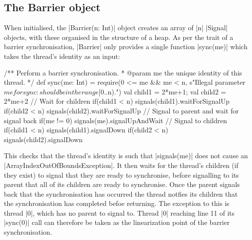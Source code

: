 
\subsection{The Barrier object}
\inlineScala
When initialised, the |Barrier(n: Int)| object creates an array of |n| |Signal| objects, with these organised in the structure of a heap. As per the trait of a barrier synchronisation, |Barrier| only provides a single function |sync(me)| which takes the thread's identity as an input:

\begin{scala}[caption={The Scala definition of the {\scalastyle Barrier.sync} function}]
/** Perform a barrier synchronisation.
  * @param me the unique identity of this thread. */
def sync(me: Int) = {
  require(0 <= me && me < n, 
    s"Illegal parameter $me for sync: should be in the range [0..$n).")
  val child1 = 2*me+1; val child2 = 2*me+2
  // Wait for children
  if(child1 < n) signals(child1).waitForSignalUp
  if(child2 < n) signals(child2).waitForSignalUp
  // Signal to parent and wait for signal back
  if(me != 0) signals(me).signalUpAndWait
  // Signal to children
  if(child1 < n) signals(child1).signalDown
  if(child2 < n) signals(child2).signalDown
}  
\end{scala}

This checks that the thread's identity is such that |signals(me)| does not cause an 
|ArrayIndexOutOfBoundsException|. It then waits for the thread's children (if they exist) to signal that they are ready to synchronise, before signalling to its parent that all of its children are ready to synchronise. Once the parent signals back that the synchronisation has occurred the thread notfies its children that the synchronisation has completed befoe returning. The exception to this is thread |0|, which has no parent to signal to. Thread |0| reaching line 11 of its |sync(0)| call can therefore be taken as the linearization point of the barrier synchronisation.

